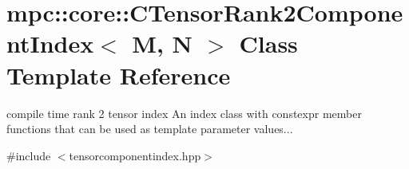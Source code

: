\hypertarget{classmpc_1_1core_1_1_c_tensor_rank2_component_index}{}\section{mpc\+:\+:core\+:\+:C\+Tensor\+Rank2\+Component\+Index$<$ M, N $>$ Class Template Reference}
\label{classmpc_1_1core_1_1_c_tensor_rank2_component_index}


compile time rank 2 tensor index An index class with constexpr member functions that can be used as template parameter values...  




{\ttfamily \#include $<$tensorcomponentindex.\+hpp$>$}

